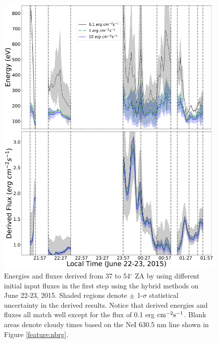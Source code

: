 \documentclass[crop=false,class=mitthesis,oneside,font=12pt]{standalone}
\begin{document}
\begin{figure}[H]
	\centering\includegraphics[width=30pc]{ratio_method_dfl.pdf}
	\caption{Energies and fluxes derived from 37 to 54$^\circ$ ZA by using different initial input fluxes in the first step using the hybrid methods on June 22-23, 2015. Shaded regions denote $\pm$ 1-$\sigma$ statistical uncertainty in the derived results. Notice that derived energies and fluxes all match well except for the flux of 0.1 erg $\rm cm^{-2} s^{-1}$. Blank areas denote cloudy times based on the NeI 630.5 nm line shown in Figure \ref{feature:nbrg}.}
	\label{fig:fl_d}
\end{figure}
\end{document}

